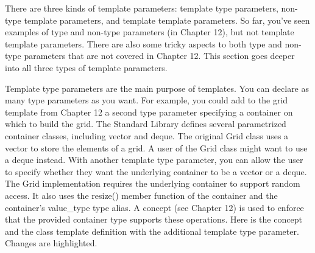 
There are three kinds of template parameters: template type parameters, non-type template parameters, and template template parameters. So far, you’ve seen examples of type and non-type parameters (in Chapter 12), but not template template parameters. There are also some tricky aspects to both type and non-type parameters that are not covered in Chapter 12. This section goes deeper into all three types of template parameters.


Template type parameters are the main purpose of templates. You can declare as many type parameters as you want. For example, you could add to the grid template from Chapter 12 a second type parameter specifying a container on which to build the grid. The Standard Library defines several parametrized container classes, including vector and deque. The original Grid class uses a vector to store the elements of a grid. A user of the Grid class might want to use a deque instead. With another template type parameter, you can allow the user to specify whether they want the underlying container to be a vector or a deque. The Grid implementation requires the underlying container to support random access. It also uses the resize() member function of the container and the container’s value\_type type alias. A concept (see Chapter 12) is used to enforce that the provided container type supports these operations. Here is the concept and the class template definition with the additional template type parameter. Changes are highlighted.

